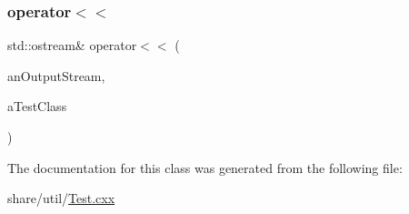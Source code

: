 \subsubsection{\texorpdfstring{operator$<$$<$}{operator<<}}
{\footnotesize\ttfamily std\+::ostream\& operator$<$$<$ (\begin{DoxyParamCaption}\item[{std\+::ostream \&}]{an\+Output\+Stream,  }\item[{const \hyperlink{classTestClass}{Test\+Class} \&}]{a\+Test\+Class }\end{DoxyParamCaption})\hspace{0.3cm}{\ttfamily [friend]}}



The documentation for this class was generated from the following file\+:\begin{DoxyCompactItemize}
\item 
share/util/\hyperlink{Test_8cxx}{Test.\+cxx}\end{DoxyCompactItemize}
